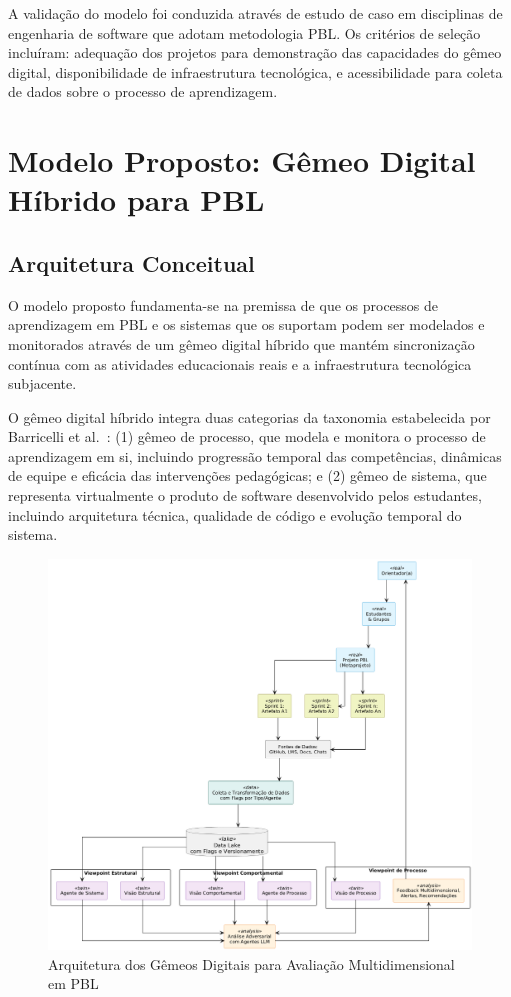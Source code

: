\documentclass[english, spanish, brazilian]{modelo_dt}
\begin{document}
A validação do modelo foi conduzida através de estudo de caso em disciplinas de engenharia de software que adotam metodologia PBL\@. Os critérios de seleção incluíram: adequação dos projetos para demonstração das capacidades do gêmeo digital, disponibilidade de infraestrutura tecnológica, e acessibilidade para coleta de dados sobre o processo de aprendizagem\@.

\section{Modelo Proposto: Gêmeo Digital Híbrido para PBL}

\subsection{Arquitetura Conceitual}

O modelo proposto fundamenta-se na premissa de que os processos de aprendizagem em PBL e os sistemas que os suportam podem ser modelados e monitorados através de um gêmeo digital híbrido que mantém sincronização contínua com as atividades educacionais reais e a infraestrutura tecnológica subjacente\@.

O gêmeo digital híbrido integra duas categorias da taxonomia estabelecida por Barricelli et al.\@~\parencite{barricelli2019systematic}: (1) gêmeo de processo, que modela e monitora o processo de aprendizagem em si, incluindo progressão temporal das competências, dinâmicas de equipe e eficácia das intervenções pedagógicas; e (2) gêmeo de sistema, que representa virtualmente o produto de software desenvolvido pelos estudantes, incluindo arquitetura técnica, qualidade de código e evolução temporal do sistema\@.

\begin{figure}[htbp]
\centering
\includegraphics[width=\linewidth,height=0.8\textheight,keepaspectratio]{assets/f1.png}
\caption{Arquitetura dos Gêmeos Digitais para Avaliação Multidimensional em PBL}
\label{fig:gemeo-digital-pbl}
\end{figure}
\end{document}
